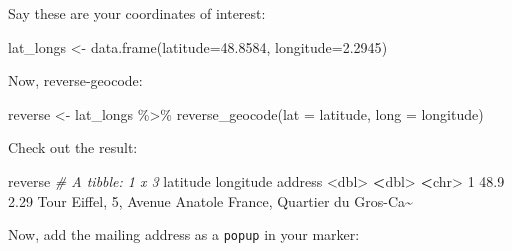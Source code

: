 \documentclass[
]{book}
\newenvironment{Shaded}{\begin{snugshade}}{\end{snugshade}}
\newcommand{\AttributeTok}[1]{\textcolor[rgb]{0.77,0.63,0.00}{#1}}
\newcommand{\CommentTok}[1]{\textcolor[rgb]{0.56,0.35,0.01}{\textit{#1}}}
\newcommand{\DecValTok}[1]{\textcolor[rgb]{0.00,0.00,0.81}{#1}}
\newcommand{\ErrorTok}[1]{\textcolor[rgb]{0.64,0.00,0.00}{\textbf{#1}}}
\newcommand{\FloatTok}[1]{\textcolor[rgb]{0.00,0.00,0.81}{#1}}
\newcommand{\FunctionTok}[1]{\textcolor[rgb]{0.00,0.00,0.00}{#1}}
\newcommand{\NormalTok}[1]{#1}
\newcommand{\OtherTok}[1]{\textcolor[rgb]{0.56,0.35,0.01}{#1}}
\newcommand{\SpecialCharTok}[1]{\textcolor[rgb]{0.00,0.00,0.00}{#1}}
\newcommand{\StringTok}[1]{\textcolor[rgb]{0.31,0.60,0.02}{#1}}
\begin{document}
Say these are your coordinates of interest:

\begin{Shaded}
\begin{Highlighting}[]
\NormalTok{lat\_longs }\OtherTok{\textless{}{-}} \FunctionTok{data.frame}\NormalTok{(}\AttributeTok{latitude=}\FloatTok{48.8584}\NormalTok{, }
                        \AttributeTok{longitude=}\FloatTok{2.2945}\NormalTok{)}
\end{Highlighting}
\end{Shaded}

Now, reverse-geocode:

\begin{Shaded}
\begin{Highlighting}[]
\NormalTok{reverse }\OtherTok{\textless{}{-}}\NormalTok{ lat\_longs }\SpecialCharTok{\%\textgreater{}\%}
    \FunctionTok{reverse\_geocode}\NormalTok{(}\AttributeTok{lat =}\NormalTok{ latitude, }
                    \AttributeTok{long =}\NormalTok{ longitude)}
\end{Highlighting}
\end{Shaded}

Check out the result:

\begin{Shaded}
\begin{Highlighting}[]
\NormalTok{reverse}
\CommentTok{\# A tibble: 1 x 3}
\NormalTok{  latitude longitude address                                                    }
     \SpecialCharTok{\textless{}}\NormalTok{dbl}\SpecialCharTok{\textgreater{}}     \ErrorTok{\textless{}}\NormalTok{dbl}\SpecialCharTok{\textgreater{}} \ErrorTok{\textless{}}\NormalTok{chr}\SpecialCharTok{\textgreater{}}                                                      
\DecValTok{1}     \FloatTok{48.9}      \FloatTok{2.29}\NormalTok{ Tour Eiffel, }\DecValTok{5}\NormalTok{, Avenue Anatole France, Quartier du Gros}\SpecialCharTok{{-}}\NormalTok{Ca}\SpecialCharTok{\textasciitilde{}}
\end{Highlighting}
\end{Shaded}

Now, add the mailing address as a \texttt{popup} in your marker:

\begin{Shaded}
\end{Shaded}
\end{document}
